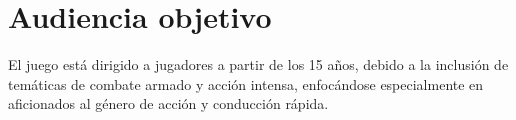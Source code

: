 \section{Audiencia objetivo}

El juego está dirigido a jugadores a partir de los 15 años, debido a la inclusión de temáticas de combate armado y acción intensa, enfocándose especialmente en aficionados al género de acción y conducción rápida.
